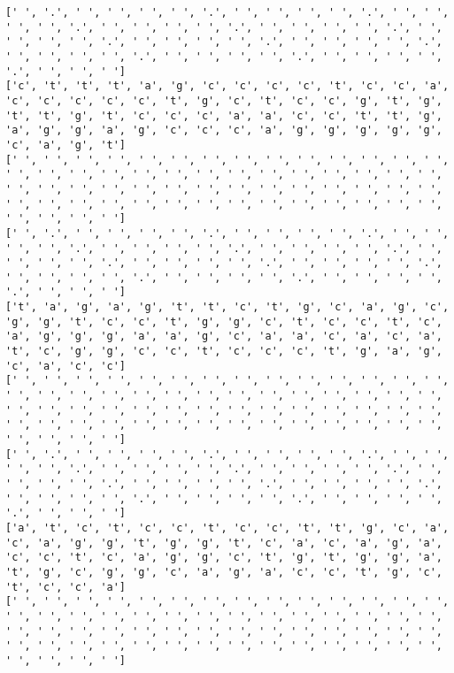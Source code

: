 \documentclass{article}
\begin{document}
\begin{Verbatim}
[' ', '.', ' ', ' ', ' ', ' ', '.', ' ', ' ', ' ', ' ', '.', ' ', ' ', ' ', ' ', '.', ' ', ' ', ' ', ' ', '.', ' ', ' ', ' ', ' ', '.', ' ', ' ', ' ', ' ', '.', ' ', ' ', ' ', ' ', '.', ' ', ' ', ' ', ' ', '.', ' ', ' ', ' ', ' ', '.', ' ', ' ', ' ', ' ', '.', ' ', ' ', ' ', ' ', '.', ' ', ' ', ' ']
['c', 't', 't', 't', 'a', 'g', 'c', 'c', 'c', 'c', 't', 'c', 'c', 'a', 'c', 'c', 'c', 'c', 'c', 't', 'g', 'c', 't', 'c', 'c', 'g', 't', 'g', 't', 't', 'g', 't', 'c', 'c', 'c', 'a', 'a', 'c', 'c', 't', 't', 'g', 'a', 'g', 'g', 'a', 'g', 'c', 'c', 'c', 'a', 'g', 'g', 'g', 'g', 'g', 'c', 'a', 'g', 't']
[' ', ' ', ' ', ' ', ' ', ' ', ' ', ' ', ' ', ' ', ' ', ' ', ' ', ' ', ' ', ' ', ' ', ' ', ' ', ' ', ' ', ' ', ' ', ' ', ' ', ' ', ' ', ' ', ' ', ' ', ' ', ' ', ' ', ' ', ' ', ' ', ' ', ' ', ' ', ' ', ' ', ' ', ' ', ' ', ' ', ' ', ' ', ' ', ' ', ' ', ' ', ' ', ' ', ' ', ' ', ' ', ' ', ' ', ' ', ' ']
[' ', '.', ' ', ' ', ' ', ' ', '.', ' ', ' ', ' ', ' ', '.', ' ', ' ', ' ', ' ', '.', ' ', ' ', ' ', ' ', '.', ' ', ' ', ' ', ' ', '.', ' ', ' ', ' ', ' ', '.', ' ', ' ', ' ', ' ', '.', ' ', ' ', ' ', ' ', '.', ' ', ' ', ' ', ' ', '.', ' ', ' ', ' ', ' ', '.', ' ', ' ', ' ', ' ', '.', ' ', ' ', ' ']
['t', 'a', 'g', 'a', 'g', 't', 't', 'c', 't', 'g', 'c', 'a', 'g', 'c', 'g', 'g', 't', 'c', 'c', 't', 'g', 'g', 'c', 't', 'c', 'c', 't', 'c', 'a', 'g', 'g', 'g', 'a', 'a', 'g', 'c', 'a', 'a', 'c', 'a', 'c', 'a', 't', 'c', 'g', 'g', 'c', 'c', 't', 'c', 'c', 'c', 't', 'g', 'a', 'g', 'c', 'a', 'c', 'c']
[' ', ' ', ' ', ' ', ' ', ' ', ' ', ' ', ' ', ' ', ' ', ' ', ' ', ' ', ' ', ' ', ' ', ' ', ' ', ' ', ' ', ' ', ' ', ' ', ' ', ' ', ' ', ' ', ' ', ' ', ' ', ' ', ' ', ' ', ' ', ' ', ' ', ' ', ' ', ' ', ' ', ' ', ' ', ' ', ' ', ' ', ' ', ' ', ' ', ' ', ' ', ' ', ' ', ' ', ' ', ' ', ' ', ' ', ' ', ' ']
[' ', '.', ' ', ' ', ' ', ' ', '.', ' ', ' ', ' ', ' ', '.', ' ', ' ', ' ', ' ', '.', ' ', ' ', ' ', ' ', '.', ' ', ' ', ' ', ' ', '.', ' ', ' ', ' ', ' ', '.', ' ', ' ', ' ', ' ', '.', ' ', ' ', ' ', ' ', '.', ' ', ' ', ' ', ' ', '.', ' ', ' ', ' ', ' ', '.', ' ', ' ', ' ', ' ', '.', ' ', ' ', ' ']
['a', 't', 'c', 't', 'c', 'c', 't', 'c', 'c', 't', 't', 'g', 'c', 'a', 'c', 'a', 'g', 'g', 't', 'g', 'g', 't', 'c', 'a', 'c', 'a', 'g', 'a', 'c', 'c', 't', 'c', 'a', 'g', 'g', 'c', 't', 'g', 't', 'g', 'g', 'a', 't', 'g', 'c', 'g', 'g', 'c', 'a', 'g', 'a', 'c', 'c', 't', 'g', 'c', 't', 'c', 'c', 'a']
[' ', ' ', ' ', ' ', ' ', ' ', ' ', ' ', ' ', ' ', ' ', ' ', ' ', ' ', ' ', ' ', ' ', ' ', ' ', ' ', ' ', ' ', ' ', ' ', ' ', ' ', ' ', ' ', ' ', ' ', ' ', ' ', ' ', ' ', ' ', ' ', ' ', ' ', ' ', ' ', ' ', ' ', ' ', ' ', ' ', ' ', ' ', ' ', ' ', ' ', ' ', ' ', ' ', ' ', ' ', ' ', ' ', ' ', ' ', ' ']

\end{Verbatim}
\end{document}
